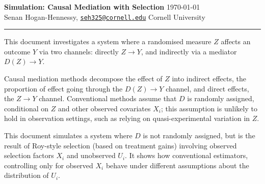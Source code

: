 \documentclass[a4paper, 12pt]{article}                                     %
\renewcommand{\vec}[1]{\boldsymbol{\mathit{#1}}}                           %
\begin{document}
\noindent
\textbf{Simulation: Causal Mediation with Selection}
\hfill
\cleanlookdateon \today \\
Senan Hogan-Hennessy, \href{mailto:seh325@cornell.edu}{\nolinkurl{seh325@cornell.edu}}
\hfill
Cornell University
\rule{\textwidth}{0.4pt}

\noindent
This document investigates a system where a randomised measure $Z$ affects an outcome $Y$ via two channels: directly $Z \to Y$, and indirectly via a mediator $D(Z) \to Y$.

Causal mediation methods decompose the effect of $Z$ into indirect effects, the proportion of effect going through the $D(Z) \to Y$ channel, and direct effects, the $Z \to Y$ channel.
Conventional methods assume that $D$ is randomly assigned, conditional on $Z$ and other observed covariates $\vec X_i$; this assumption is unlikely to hold in observation settings, such as relying on quasi-experimental variation in $Z$.

This document simulates a system where $D$ is not randomly assigned, but is the result of Roy-style selection (based on treatment gains) involving observed selection factors $\vec X_i$ and unobserved $U_i$.
It shows how conventional estimators, controlling only for observed $\vec X_i$ behave under different assumptions about the distribution of $U_i$.
\end{document}
